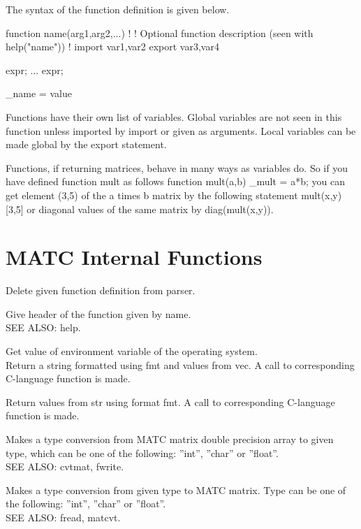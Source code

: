 The syntax of the function definition is given below. 

\ttbegin
function name(arg1,arg2,...)
!
! Optional function description (seen with help("name"))
!
import var1,var2
export var3,var4
{
    expr;
     ...
    expr;

    \_name = value
}
\ttend

Functions have their own list of variables. Global variables are not seen in this 
function unless imported by import or given as arguments. Local variables can be made global by the export statement. 

Functions, if returning matrices, behave in many ways as variables do. So if you have defined function mult as follows 
\ttbegin
function mult(a,b)
{
   _mult = a*b;
}
\ttend
you can get element (3,5) of the a times b matrix by the following statement 
\ttbegin
mult(x,y)[3,5]
\ttend
or diagonal values of the same matrix by 
\ttbegin
diag(mult(x,y)).
\ttend


\section{MATC Internal Functions}

\sifbegin
{}
Delete given function definition from parser. 

Give header of the function given by name. \\
SEE ALSO: help. 

Get value of environment variable of the operating system. \\

Return a string formatted using fmt and values from vec. A call to corresponding C-language function is made. 

Return values from str using format fmt. A call to corresponding C-language function is made. 

Makes a type conversion from MATC matrix double precision array to given type, 
which can be one of the following: ''int'', ''char'' or ''float''. \\
SEE ALSO: cvtmat, fwrite. 

Makes a type conversion from given type to MATC matrix. Type can be one of the following: ''int'', ''char'' or ''float''. \\
SEE ALSO: fread, matcvt. 

